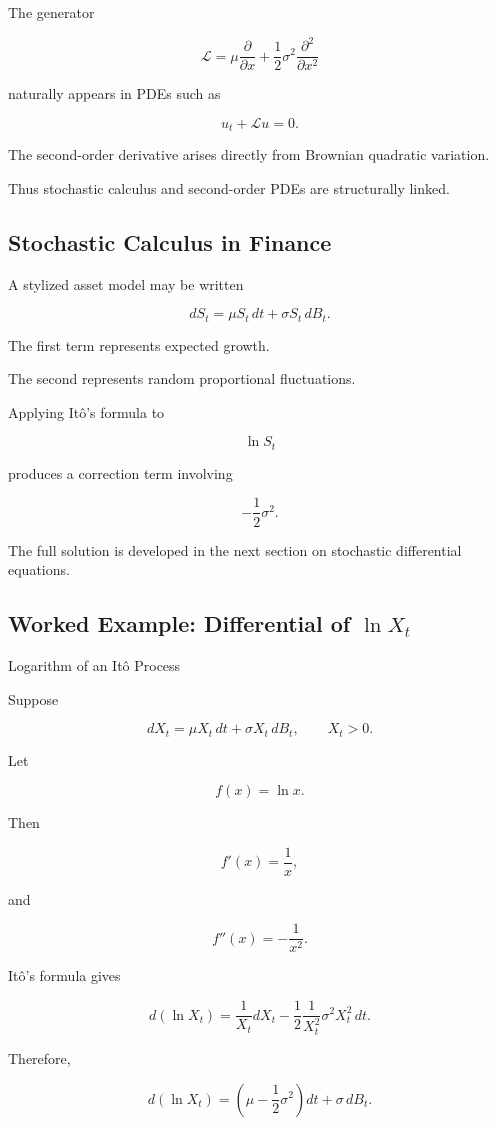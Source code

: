 The generator

\[
\mathcal{L}
=
\mu\frac{\partial}{\partial x}
+
\frac12\sigma^2
\frac{\partial^2}{\partial x^2}
\]

naturally appears in PDEs such as

\[
\boxed{
u_t+\mathcal{L}u=0.
}
\]

The second-order derivative arises directly from Brownian quadratic
variation.

Thus stochastic calculus and second-order PDEs are structurally linked.

\subsection{Stochastic Calculus in Finance}
\label{subsec:stochastic-calculus-finance}

A stylized asset model may be written

\[
\boxed{
dS_t
=
\mu S_t\,dt
+
\sigma S_t\,dB_t.
}
\]

The first term represents expected growth.

The second represents random proportional fluctuations.

Applying It\^o's formula to

\[
\ln S_t
\]

produces a correction term involving

\[
-\frac12\sigma^2.
\]

The full solution is developed in the next section on stochastic
differential equations.

\subsection{Worked Example: Differential of \(\ln X_t\)}
\label{subsec:worked-ito-log}

\begin{workedexamplebox}{Logarithm of an It\^o Process}

Suppose

\[
dX_t
=
\mu X_t\,dt
+
\sigma X_t\,dB_t,
\qquad
X_t>0.
\]

Let

\[
f(x)=\ln x.
\]

Then

\[
f'(x)=\frac1x,
\]

and

\[
f''(x)
=
-\frac1{x^2}.
\]

It\^o's formula gives

\[
d(\ln X_t)
=
\frac1{X_t}dX_t
-
\frac12
\frac1{X_t^2}
\sigma^2X_t^2\,dt.
\]

Therefore,

\begin{answerbox}
\[
\boxed{
d(\ln X_t)
=
\left(
\mu-\frac12\sigma^2
\right)dt
+
\sigma\,dB_t.
}
\]
\end{answerbox}

\end{workedexamplebox}

